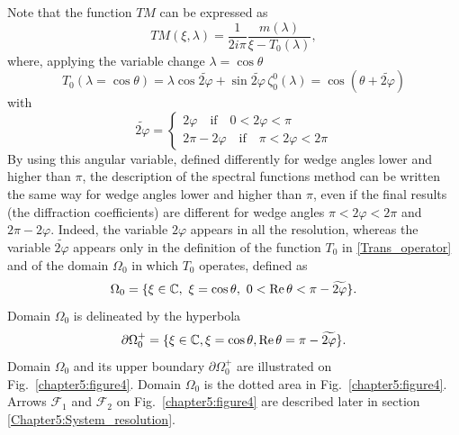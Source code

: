 Note that the function $TM$ can be expressed as
\begin{equation}
TM(\xi,\lambda) =  \dfrac{1}{2i\pi} \dfrac{ m(\lambda)}{ \xi- T_0(\lambda)} , 
\end{equation}
where, applying the variable change $\lambda=\cos\theta$
\begin{equation}
\label{Trans_operator}
T_0(\lambda=\cos\theta) =  \lambda \cos \widetilde{2\varphi}  + \sin \widetilde{2\varphi} \, \zeta_0^0(\lambda) =  \cos (\theta + \widetilde{2\varphi})
\end{equation}
with 
\begin{equation}
\widetilde{2\varphi} =
\begin{cases}
 2\varphi \quad \text{if} \quad 0 < 2\varphi < \pi \qquad \\
 2\pi - 2\varphi \quad \text{if} \quad \pi < 2\varphi < 2\pi
 \label{phitilde}
\end{cases}
\end{equation}
By using this angular variable, defined differently for wedge angles lower and higher than $\pi$, the description of the spectral functions method can be written the same way for wedge angles lower and higher than $\pi$, even if the final results (the diffraction coefficients) are different for wedge angles $\pi<2\varphi<2\pi$ and $2\pi-2\varphi$. Indeed, the variable $2\varphi$ appears in all the resolution, whereas the variable $\widetilde{2\varphi}$ appears only in the definition of the function $T_0$ in \eqref{Trans_operator} and of the domain $\Omega_0$ in which $T_0$ operates, defined as
\begin{equation}
\label{Domain_Omega0}
\Omega_0 =\{\xi\in\mathbb C, \ \xi=\cos \theta, \ 0< {\rm Re } \, \theta < \pi -\widetilde{2\varphi} \}.
\end{equation}
Domain $\Omega_0$ is delineated by the hyperbola 
\begin{equation}
\partial \Omega_0^+ = \{   \xi \in \mathbb{C},  \xi = \cos \theta, {\rm Re} \, \theta = \pi - \widetilde{2\varphi} \}.
\end{equation}
Domain $\Omega_0$ and its upper boundary $\partial \Omega_0^+$ are illustrated on Fig.~\ref{chapter5:figure4}. Domain $\Omega_0$ is the dotted area in Fig.~\ref{chapter5:figure4}. Arrows $\mathcal{F}_1$ and $\mathcal{F}_2$ on Fig.~\ref{chapter5:figure4} are described later in section \ref{Chapter5:System_resolution}.

